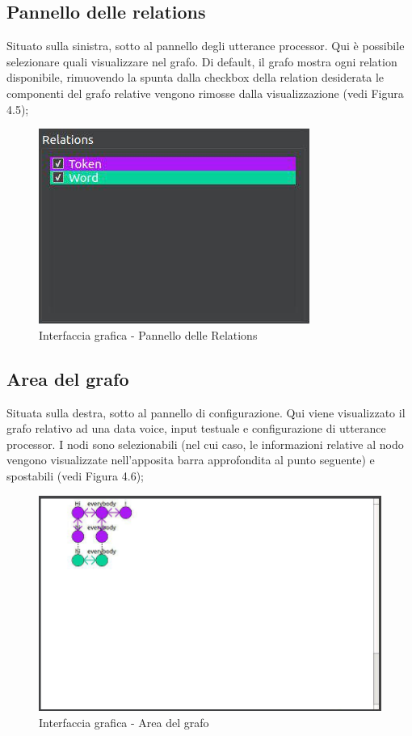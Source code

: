 \documentclass[openany,12pt,a4paper]{report}
\begin{document}
 	\subsection{Pannello delle relations}
 	Situato sulla sinistra, sotto al pannello degli utterance processor. Qui è possibile selezionare quali  visualizzare nel grafo. Di default, il grafo mostra ogni relation disponibile, rimuovendo la spunta dalla checkbox della relation desiderata le componenti del grafo relative vengono rimosse dalla visualizzazione (vedi Figura 4.5);
 		\begin{figure}[H]
 			
 			\centering
 			
 				\includegraphics[width=.4\textwidth]{./img/pannello_relations}
 			
 			\caption{Interfaccia grafica - Pannello delle Relations}
 			
 		\end{figure}
 	
 	\subsection{Area del grafo}
 	Situata sulla destra, sotto al pannello di configurazione. Qui viene visualizzato il grafo relativo ad una data voice, input testuale e configurazione di utterance processor. I nodi sono selezionabili (nel cui caso, le informazioni relative al nodo vengono visualizzate nell'apposita barra approfondita al punto seguente) e spostabili (vedi Figura 4.6);
 		\begin{figure}[H]
 			
 			\centering
 			
 				\includegraphics[width=\textwidth]{./img/area_grafo}
 			
 			\caption{Interfaccia grafica - Area del grafo}
 			
 		\end{figure}
 	
\end{document}
